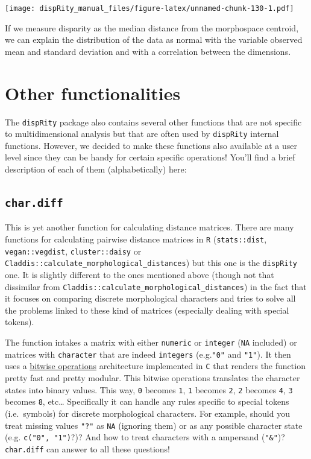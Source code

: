 \documentclass[]{book}
\begin{document}
\texttt{[image: dispRity\_manual\_files/figure-latex/unnamed-chunk-130-1.pdf]}

If we measure disparity as the median distance from the morphospace centroid, we can explain the distribution of the data as normal with the variable observed mean and standard deviation and with a correlation between the dimensions.

\hypertarget{other-functionalities}{%
\chapter{Other functionalities}\label{other-functionalities}}

The \texttt{dispRity} package also contains several other functions that are not specific to multidimensional analysis but that are often used by \texttt{dispRity} internal functions.
However, we decided to make these functions also available at a user level since they can be handy for certain specific operations!
You'll find a brief description of each of them (alphabetically) here:

\hypertarget{char.diff}{%
\section{\texorpdfstring{\texttt{char.diff}}{char.diff}}\label{char.diff}}

This is yet another function for calculating distance matrices.
There are many functions for calculating pairwise distance matrices in \texttt{R} (\texttt{stats::dist}, \texttt{vegan::vegdist}, \texttt{cluster::daisy} or \texttt{Claddis::calculate\_morphological\_distances}) but this one is the \texttt{dispRity} one.
It is slightly different to the ones mentioned above (though not that dissimilar from \texttt{Claddis::calculate\_morphological\_distances}) in the fact that it focuses on comparing discrete morphological characters and tries to solve all the problems linked to these kind of matrices (especially dealing with special tokens).

The function intakes a matrix with either \texttt{numeric} or \texttt{integer} (\texttt{NA} included) or matrices with \texttt{character} that are indeed \texttt{integers} (e.g.\texttt{"0"} and \texttt{"1"}).
It then uses a \href{https://en.wikipedia.org/wiki/Bitwise_operations_in_C}{bitwise operations} architecture implemented in \texttt{C} that renders the function pretty fast and pretty modular.
This bitwise operations translates the character states into binary values.
This way, \texttt{0} becomes \texttt{1}, \texttt{1} becomes \texttt{2}, \texttt{2} becomes \texttt{4}, \texttt{3} becomes \texttt{8}, etc\ldots{}
Specifically it can handle any rules specific to special tokens (i.e.~symbols) for discrete morphological characters. For example, should you treat missing values \texttt{"?"} as \texttt{NA} (ignoring them) or as any possible character state (e.g. \texttt{c("0",\ "1")}?)? And how to treat characters with a ampersand (\texttt{"\&"})? \texttt{char.diff} can answer to all these questions!
\end{document}
